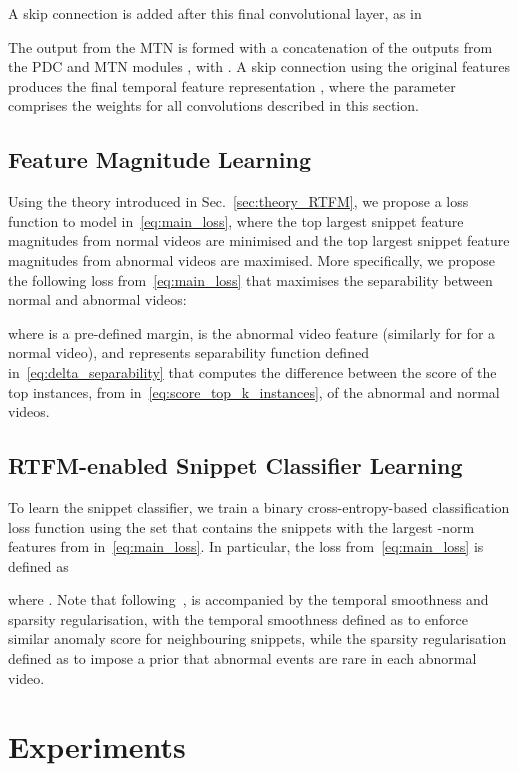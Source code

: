 \documentclass[10pt,twocolumn,letterpaper]{article}
\begin{document}
A skip connection is added after this final  convolutional layer, as in


The output from the MTN is formed with a concatenation of the outputs from the PDC and MTN modules , with .  A skip connection using the original features  produces the final temporal feature representation ,
where the parameter  comprises the weights for all convolutions described in this section.



\subsection{Feature Magnitude Learning}
\label{sec:top_k_MIL} 


Using the theory introduced in Sec.~\ref{sec:theory_RTFM}, we propose a loss function to model  in~\eqref{eq:main_loss}, where the top  largest snippet feature magnitudes from normal videos are minimised and the top  largest snippet feature magnitudes from abnormal videos are maximised.
More specifically, we propose the following loss  from~\eqref{eq:main_loss} that maximises the separability between normal and abnormal videos:

where  is a pre-defined margin,  is the abnormal video feature (similarly for  for a normal video),
and  represents separability function defined in~\eqref{eq:delta_separability} that computes the difference between 
the score of the top  instances, from  in~\eqref{eq:score_top_k_instances}, of the abnormal and normal videos. 



\subsection{RTFM-enabled Snippet Classifier Learning}

To learn the snippet classifier, we train a binary cross-entropy-based classification loss function using the set  that contains the  snippets with the largest -norm features from  in~\eqref{eq:main_loss}.
In particular, the loss  from~\eqref{eq:main_loss} is defined as

where .
Note that following~\cite{sultani2018real},  is accompanied by the temporal smoothness and sparsity regularisation, with the temporal smoothness defined as  to enforce similar anomaly score for neighbouring snippets, while the sparsity regularisation defined as  to impose a prior that abnormal events are rare in each abnormal video.
\section{Experiments}
\end{document}
